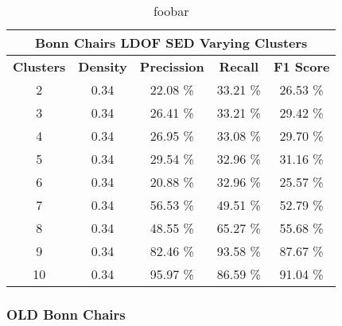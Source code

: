 \begin{table}[H]
\centering
\begin{tabular}{|c|c|c|c|c|}
\hline
\multicolumn{5}{|c|}{Bonn Chairs LDOF SED Varying Clusters}                        \\ \hline
\textbf{Clusters} & \textbf{Density} & \textbf{Precission} & \textbf{Recall} & \textbf{F1 Score} \\ \hline
2 & 0.34 & 22.08 \%   & 33.21 \%     & 26.53 \%  \\ \hline
3 & 0.34 & 26.41 \%   & 33.21 \%     & 29.42 \%  \\ \hline
4 & 0.34 & 26.95 \%   & 33.08 \%     & 29.70 \%  \\ \hline
5 & 0.34 & 29.54 \%   & 32.96 \%     & 31.16 \%  \\ \hline
6 & 0.34 & 20.88 \%   & 32.96 \%     & 25.57 \%  \\ \hline
7 & 0.34 & 56.53 \%   & 49.51 \%     & 52.79 \%  \\ \hline
8 & 0.34 & 48.55 \%   & 65.27 \%     & 55.68 \%  \\ \hline
9 & 0.34 & 82.46 \%   & 93.58 \%     & 87.67 \%  \\ \hline              
10 & 0.34 & 95.97 \%   & 86.59 \%     & 91.04 \%  \\ \hline
\end{tabular}
\caption[Bonn Chairs SED Varying Clusters]{foobar}
\label{tab:bonn_chairs_ldof_sed_c_6_9_10_eval}
\end{table}


\subsubsection{OLD Bonn Chairs}


